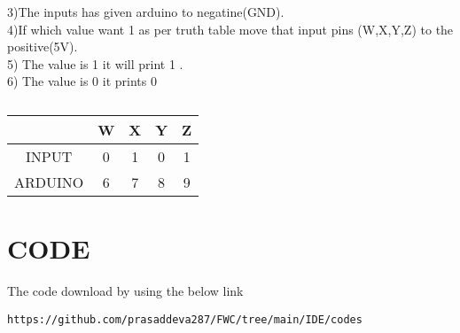\documentclass[journal,12pt,twocolumn]{IEEEtran}
\begin{document}
3)The inputs has given arduino to negatine(GND).
\\4)If  which value want 1 as per truth table move that input pins (W,X,Y,Z) to the positive(5V).
\\5) The value is 1 it will print 1 .
\\6) The value is 0 it prints 0
\begin{table}
    \centering
    \begin{tabular}{|c|c|c|c|c|}
    \hline
         &W&X&Y&Z  \\
         \hline
         INPUT&0&1&0&1 \\
         \hline
         ARDUINO&6&7&8&9 \\
         \hline
    \end{tabular}
    \caption{}
\end{table}
\bigskip

\section{CODE}
The code download by using the below link
\begin{lstlisting}
https://github.com/prasaddeva287/FWC/tree/main/IDE/codes
\end{lstlisting}
\end{document}
